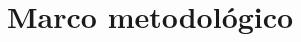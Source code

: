 \documentclass[a4paper, 11pt, twoside]{book}
\begin{document}
               



        \part{Marco metodológico}

        

            

            
        
            

         
\end{document}
